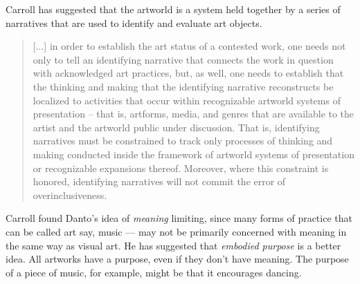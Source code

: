         Carroll has suggested that the artworld is a system held together by a series of narratives that are used to identify and evaluate art objects.
        
        \begin{quote}
            [...] in order to establish the art status of a contested work, one needs not only to tell an identifying narrative that connects the work in question with acknowledged art practices, but, as well, one needs to establish that the thinking and making that the identifying narrative reconstructs be localized to activities that occur within recognizable artworld systems of presentation – that is, artforms, media, and genres that are available to the artist and the artworld public under discussion. That is, identifying narratives must be constrained to track only processes of thinking and making conducted inside the framework of artworld systems of presentation or recognizable expansions thereof. Moreover, where this constraint is honored, identifying narratives will not commit the error of overinclusiveness. \citep[p.116]{CarrollHstrclNrrtvs2001}
        \end{quote}
    
        Carroll found Danto's idea of \emph{meaning} limiting, since many forms of practice that can be called art  say, music — may not be primarily concerned with meaning in the same way as visual art. He has suggested that \emph{embodied purpose} is a better idea. All artworks have a purpose, even if they don't have meaning. The purpose of a piece of music, for example, might be that it encourages dancing.

